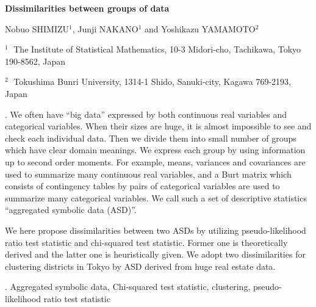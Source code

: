 \documentclass[12pt]{article}
\begin{document}
\begin{flushleft}


{\LARGE\bf Dissimilarities between groups of data}


\vspace{1.0cm}

Nobuo SHIMIZU$^1$, Junji NAKANO$^1$ and Yoshikazu YAMAMOTO$^2$

\begin{description}

\item $^1 \;$ The Institute of Statistical Mathematics,
10-3 Midori-cho, Tachikawa, Tokyo 190-8562, Japan

\item $^2 \;$ Tokushima Bunri University,
1314-1 Shido, Sanuki-city, Kagawa 769-2193, Japan

\end{description}

\end{flushleft}


\vspace{0.75cm}

. 
We often have ``big data'' expressed by both continuous real variables and categorical variables. 
When their sizes are huge, it is almost impossible to see and check each individual data. 
Then we divide them into small number of groups which have clear domain meanings. 
We express each group by using information up to second order moments. 
For example, means, variances and covariances are used to summarize many continuous real variables, 
and a Burt matrix which consists of contingency tables by pairs of categorical variables are used to summarize many categorical variables. 
We call such a set of descriptive statistics ``aggregated symbolic data (ASD)''.

We here propose dissimilarities between two ASDs by utilizing pseudo-likelihood ratio test statistic and chi-squared test statistic. 
Former one is theoretically derived and the latter one is heuristically given. 
We adopt two dissimilarities for clustering districts in Tokyo by ASD derived from huge real estate data.

\vskip 2mm

.
Aggregated symbolic data, Chi-squared test statistic, clustering, pseudo-likelihood ratio test statistic
\end{document}
